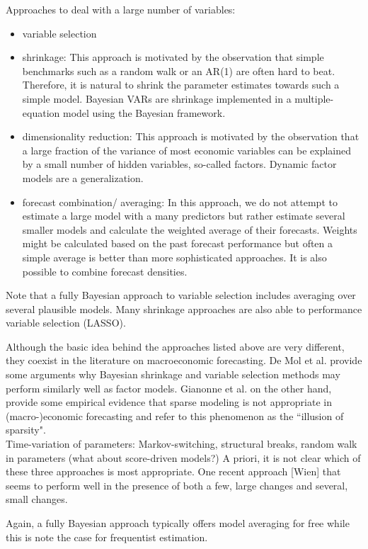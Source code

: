 \documentclass[12pt,a4paper]{scrartcl}
\begin{document}
Approaches to deal with a large number of variables:
\begin{itemize}
	\item variable selection
	\item shrinkage: This approach is motivated by the observation that simple benchmarks such as a random walk or an AR(1) are often hard to beat. Therefore, it is natural to shrink the parameter estimates towards such a simple model. Bayesian VARs are shrinkage implemented in a multiple-equation model using the Bayesian framework.
	\item dimensionality reduction: This approach is motivated by the observation that a large fraction of the variance of most economic variables can be explained by a small number of hidden variables, so-called factors. Dynamic factor models are a generalization.
	\item forecast combination/ averaging: In this approach, we do not attempt to estimate a large model with a many predictors but rather estimate several smaller models and calculate the weighted average of their forecasts. Weights might be calculated based on the past forecast performance but often a simple average is better than more sophisticated approaches. It is also possible to combine forecast densities.
\end{itemize}

Note that a fully Bayesian approach to variable selection includes averaging over several plausible models. Many shrinkage approaches are also able to performance variable selection (LASSO).

Although the basic idea behind the approaches listed above are very different, they coexist in the literature on macroeconomic forecasting. De Mol et al. provide some arguments why Bayesian shrinkage and variable selection methods may perform similarly well as factor models. Gianonne et al. on the other hand, provide some empirical evidence that sparse modeling is not appropriate in (macro-)economic forecasting and refer to this phenomenon as the ``illusion of sparsity".\\

Time-variation of parameters: Markov-switching, structural breaks, random walk in parameters (what about score-driven models?) A priori, it is not clear which of these three approaches is most appropriate. One recent approach [Wien] that seems to perform well in the presence of both a few, large changes and several, small changes.

Again, a fully Bayesian approach typically offers model averaging for free while this is note the case for frequentist estimation.
\end{document}
